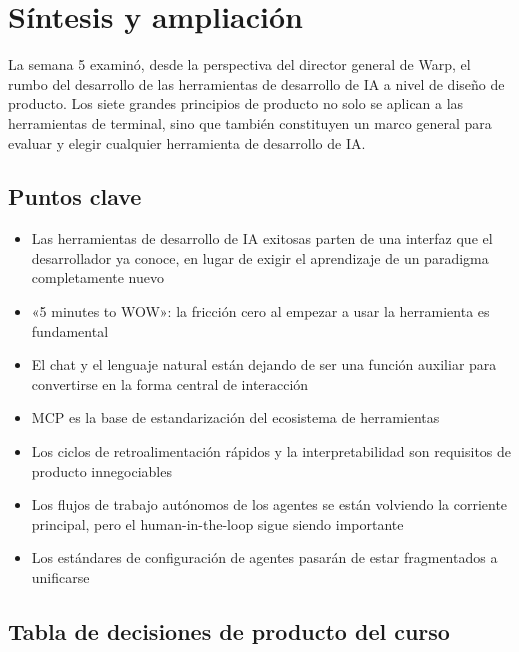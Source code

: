 \section{Síntesis y ampliación}

La semana 5 examinó, desde la perspectiva del director general de Warp, el rumbo del desarrollo de las herramientas de desarrollo de IA a nivel de diseño de producto. Los siete grandes principios de producto no solo se aplican a las herramientas de terminal, sino que también constituyen un marco general para evaluar y elegir cualquier herramienta de desarrollo de IA.

\subsection{Puntos clave}

\begin{itemize}
    \item Las herramientas de desarrollo de IA exitosas parten de una interfaz que el desarrollador ya conoce, en lugar de exigir el aprendizaje de un paradigma completamente nuevo
    \item «5 minutes to WOW»: la fricción cero al empezar a usar la herramienta es fundamental
    \item El chat y el lenguaje natural están dejando de ser una función auxiliar para convertirse en la forma central de interacción
    \item MCP es la base de estandarización del ecosistema de herramientas
    \item Los ciclos de retroalimentación rápidos y la interpretabilidad son requisitos de producto innegociables
    \item Los flujos de trabajo autónomos de los agentes se están volviendo la corriente principal, pero el human-in-the-loop sigue siendo importante
    \item Los estándares de configuración de agentes pasarán de estar fragmentados a unificarse
\end{itemize}

\subsection{Tabla de decisiones de producto del curso}

